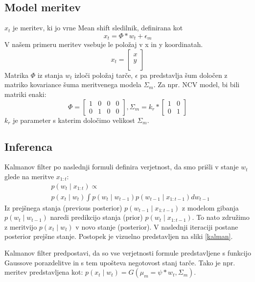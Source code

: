 \documentclass[a4paper]{article}
\begin{document}
\subsection{Model meritev} 
$x_t$ je meritev, ki jo vrne Mean shift sledilnik, definirana kot $$x_t = \Phi*w_{t} + \epsilon_m$$ V našem primeru meritev vsebuje le položaj v x in y koordinatah.
$$
x_t=
\begin{bmatrix}
x\\y\\
\end{bmatrix}
$$
Matrika $\Phi$ iz stanja $w_t$ izloči položaj tarče, $\epsilon$ pa predstavlja šum določen z matriko kovariance šuma meritvenega modela $\Sigma_m$. Za npr. NCV model, bi bili matriki enaki:
$$
\Phi=\begin{bmatrix}
	1&0&0&0\\0&1&0&0
\end{bmatrix}
,\Sigma_m = k_r*\begin{bmatrix}
	1&0\\0&1
\end{bmatrix}
$$
$k_r$ je parameter s katerim določimo velikost $\Sigma_m$.

\subsection{Inferenca} 
Kalmanov filter po naslednji formuli definira verjetnost, da smo prišli v stanje $w_t$ glede na meritve $x_{1:t}$:
\begin{align*}
&p(w_t\mid x_{1:t}) \propto\\ 
&p(x_t\mid w_t)\int p(w_t\mid w_{t-1})p(w_{t-1}\mid x_{1:t-1})dw_{t-1}
\end{align*}
Iz prejšnega stanja (previous posterior) $p(w_{t-1}\mid x_{1:t-1})$ z modelom gibanja $p(w_t\mid w_{t-1})$ naredi predikcijo stanja (prior) $p(w_{t}\mid x_{1:t-1})$. To nato združimo z meritvijo $p(x_t\mid w_t)$ v novo stanje (posterior). V naslednji iteraciji postane posterior prejšne stanje. Postopek je vizuelno predstavljen na sliki \ref{kalman}.

Kalmanov filter predpostavi, da so vse verjetnosti formule predstavljene s funkcijo Gaussove porazdelitve in s tem upošteva negotovost stanj tarče. Tako je npr. meritev predstavljena kot: $p(x_t\mid w_t) = G(\mu_m = \psi*w_t, \Sigma_m)$.
\end{document}
